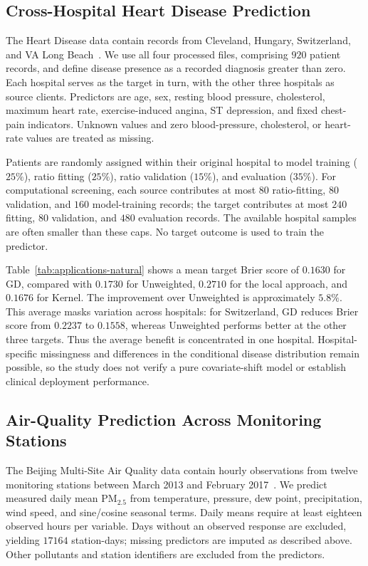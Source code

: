 \subsection{Cross-Hospital Heart Disease Prediction}

The Heart Disease data contain records from Cleveland, Hungary, Switzerland,
and VA Long Beach~\citep{janosi1989heart}. We use all four processed files,
comprising $920$ patient records, and define disease presence as a recorded
diagnosis greater than zero. Each hospital serves as the target in turn,
with the other three hospitals as source clients. Predictors are age, sex,
resting blood pressure, cholesterol, maximum heart rate, exercise-induced
angina, ST depression, and fixed chest-pain indicators. Unknown values and
zero blood-pressure, cholesterol, or heart-rate values are treated as missing.

Patients are randomly assigned within their original hospital to model
training ($25\%$), ratio fitting ($25\%$), ratio validation ($15\%$), and
evaluation ($35\%$). For computational screening, each source contributes
at most $80$ ratio-fitting, $80$ validation, and $160$ model-training records;
the target contributes at most $240$ fitting, $80$ validation, and $480$
evaluation records. The available hospital samples are often smaller than
these caps. No target outcome is used to train the predictor.

Table~\ref{tab:applications-natural} shows a mean target Brier score of
$0.1630$ for GD, compared with $0.1730$ for Unweighted, $0.2710$ for the local
approach, and $0.1676$ for Kernel. The improvement over Unweighted is approximately
$5.8\%$. This average masks variation across hospitals: for Switzerland,
GD reduces Brier score from $0.2237$ to $0.1558$, whereas Unweighted performs
better at the other three targets. Thus the average benefit is concentrated
in one hospital. Hospital-specific missingness and differences in the conditional disease
distribution remain possible, so the study does not verify a pure
covariate-shift model or establish clinical deployment performance.

\subsection{Air-Quality Prediction Across Monitoring Stations}

The Beijing Multi-Site Air Quality data contain hourly observations from
twelve monitoring stations between March 2013 and February
2017~\citep{chen2017beijing}. We predict measured daily mean PM$_{2.5}$ from
temperature, pressure, dew point, precipitation, wind speed, and sine/cosine
seasonal terms. Daily means require at least eighteen observed hours per
variable. Days without an observed response are excluded, yielding $17164$
station-days; missing predictors are imputed as described above. Other
pollutants and station identifiers are excluded from the predictors.

